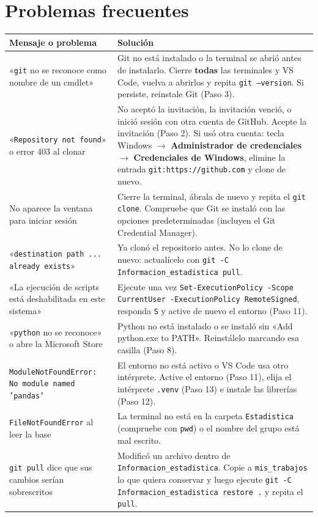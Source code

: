 \documentclass[11pt,a4paper]{article}
\newcommand{\cmd}[1]{\texttt{\textcolor{petroleo}{#1}}}
\begin{document}
\section{Problemas frecuentes}

\begin{center}
\small
\renewcommand{\arraystretch}{1.3}
\begin{tabularx}{\textwidth}{L{5.0cm}Y}
\toprule
\textbf{Mensaje o problema} & \textbf{Solución} \\
\midrule
«\texttt{git} no se reconoce como nombre de un cmdlet» & Git no está instalado o la terminal se abrió antes de instalarlo. Cierre \textbf{todas} las terminales y VS Code, vuelva a abrirlos y repita \cmd{git --version}. Si persiste, reinstale Git (Paso 3). \\
«\texttt{Repository not found}» o error 403 al clonar & No aceptó la invitación, la invitación venció, o inició sesión con otra cuenta de GitHub. Acepte la invitación (Paso 2). Si usó otra cuenta: tecla Windows $\rightarrow$ \textbf{Administrador de credenciales} $\rightarrow$ \textbf{Credenciales de Windows}, elimine la entrada \texttt{git:https://github.com} y clone de nuevo. \\
No aparece la ventana para iniciar sesión & Cierre la terminal, ábrala de nuevo y repita el \texttt{git clone}. Compruebe que Git se instaló con las opciones predeterminadas (incluyen el Git Credential Manager). \\
«\texttt{destination path ... already exists}» & Ya clonó el repositorio antes. No lo clone de nuevo: actualícelo con \cmd{git -C Informacion\_estadistica pull}. \\
«La ejecución de scripts está deshabilitada en este sistema» & Ejecute una vez \cmd{Set-ExecutionPolicy -Scope CurrentUser -ExecutionPolicy RemoteSigned}, responda \texttt{S} y active de nuevo el entorno (Paso 11). \\
«\texttt{python} no se reconoce» o abre la Microsoft Store & Python no está instalado o se instaló sin «Add python.exe to PATH». Reinstálelo marcando esa casilla (Paso 8). \\
\texttt{ModuleNotFoundError: No module named 'pandas'} & El entorno no está activo o VS Code usa otro intérprete. Active el entorno (Paso 11), elija el intérprete \texttt{.venv} (Paso 13) e instale las librerías (Paso 12). \\
\texttt{FileNotFoundError} al leer la base & La terminal no está en la carpeta \texttt{Estadistica} (compruebe con \cmd{pwd}) o el nombre del grupo está mal escrito. \\
\texttt{git pull} dice que sus cambios serían sobrescritos & Modificó un archivo dentro de \texttt{Informacion\_estadistica}. Copie a \texttt{mis\_trabajos} lo que quiera conservar y luego ejecute \cmd{git -C Informacion\_estadistica restore .} y repita el \texttt{pull}. \\
\bottomrule
\end{tabularx}
\end{center}
\end{document}

